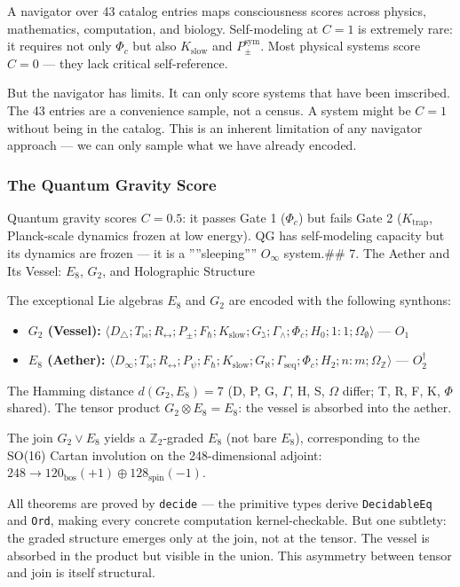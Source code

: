\documentclass[12pt,a4paper]{article}
\begin{document}
A navigator over 43 catalog entries maps consciousness scores across physics, mathematics, computation, and biology. Self-modeling at $C = 1$ is extremely rare: it requires not only $\Phi_c$ but also $K_\text{slow}$ and $P_{\pm}^{\text{sym}}$. Most physical systems score $C = 0$ --- they lack critical self-reference.

But the navigator has limits. It can only score systems that have been imscribed. The 43 entries are a convenience sample, not a census. A system might be $C = 1$ without being in the catalog. This is an inherent limitation of any navigator approach --- we can only sample what we have already encoded.

\subsubsection{The Quantum Gravity Score}

Quantum gravity scores $C = 0.5$: it passes Gate 1 ($\Phi_c$) but fails Gate 2 ($K_\text{trap}$, Planck-scale dynamics frozen at low energy). QG has self-modeling capacity but its dynamics are frozen --- it is a ''''sleeping'''' $O_{\infty}$ system.\#\# 7. The Aether and Its Vessel: $E_8$, $G_2$, and Holographic Structure

The exceptional Lie algebras $E_8$ and $G_2$ are encoded with the following synthons:

\begin{itemize}
    \item \textbf{$G_2$ (Vessel):} $\langle D_{\triangle}; T_{\bowtie}; R_{\leftrightarrow}; P_{\pm}; F_{\hbar}; K_\text{slow}; G_{\gimel}; \Gamma_{\wedge}; \Phi_c; H_0; 1{:}1; \Omega_{\emptyset} \rangle$ --- $O_1$
    \item \textbf{$E_8$ (Aether):} $\langle D_{\infty}; T_{\bowtie}; R_{\leftrightarrow}; P_{\psi}; F_{\hbar}; K_\text{slow}; G_{\aleph}; \Gamma_\text{seq}; \Phi_c; H_2; n{:}m; \Omega_\mathbb{Z} \rangle$ --- $O_2^\dagger$
\end{itemize}

The Hamming distance $d(G_2, E_8) = 7$ (D, P, G, $\Gamma$, H, S, $\Omega$ differ; T, R, F, K, $\Phi$ shared). The tensor product $G_2 \otimes E_8 = E_8$: the vessel is absorbed into the aether.

The join $G_2 \vee E_8$ yields a $\mathbb{Z}_2$-graded $E_8$ (not bare $E_8$), corresponding to the SO(16) Cartan involution on the 248-dimensional adjoint: $248 \to 120_\text{bos}(+1) \oplus 128_\text{spin}(-1)$.

All theorems are proved by \texttt{decide} --- the primitive types derive \texttt{DecidableEq} and \texttt{Ord}, making every concrete computation kernel-checkable. But one subtlety: the graded structure emerges only at the join, not at the tensor. The vessel is absorbed in the product but visible in the union. This asymmetry between tensor and join is itself structural.
\end{document}
